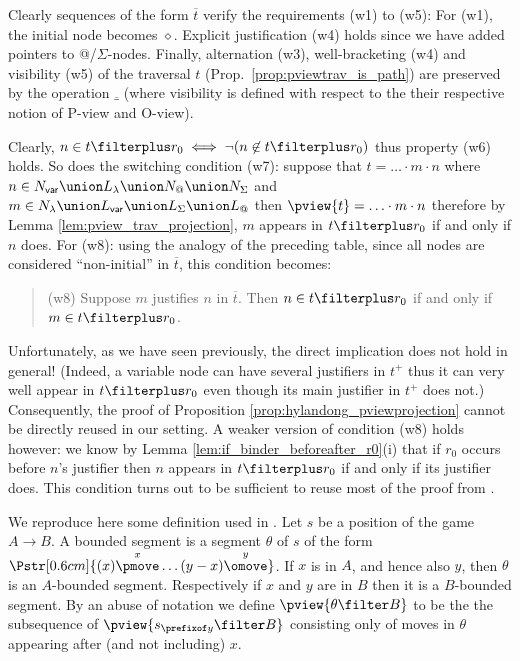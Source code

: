 Clearly sequences of the form $\overline{t}$ verify the requirements (w1) to (w5): For (w1), the initial node
becomes $\diamond$. Explicit justification (w4) holds since we have added pointers to @/$\Sigma$-nodes.
Finally, alternation (w3), well-bracketing (w4) and visibility (w5) of the traversal $t$ (Prop.\
\ref{prop:pviewtrav_is_path}) are preserved by the operation $\overline{\_}$
(where visibility is defined with respect to the their respective
notion of P-view and O-view).

Clearly, $n \in t\filterplus r_0 \iff \neg ( n \not\in t\filterplus
r_0)$ thus property (w6) holds. So does the switching condition
(w7): suppose that $t = \ldots \cdot m \cdot n$ where $n\in N_{\sf
var} \union L_\lambda \union N_@ \union N_\Sigma$ and $m \in
N_\lambda \union L_{\sf var} \union L_\Sigma \union L_@$ then
$\pview{t} = \ldots \cdot m \cdot n$ therefore by Lemma
\ref{lem:pview_trav_projection}, $m$ appears in $t\filterplus r_0$
if and only if $n$ does. For (w8): using the analogy of the
preceding table, since all nodes are considered ``non-initial'' in
$\overline{t}$, this condition becomes:
\begin{quote}
 (w8) Suppose $m$ justifies $n$ in $\overline{t}$. Then $n \in t\filterplus r_0$ if and only if $m\in t\filterplus r_0$.
\end{quote}
Unfortunately, as we have seen previously, the direct implication does not hold in general! (Indeed, a variable node can have several
justifiers in $t^+$ thus it can very well appear in $t\filterplus r_0$ even though its main justifier in $t^+$ does not.) Consequently, the proof of Proposition \ref{prop:hylandong_pviewprojection} cannot be
directly reused in our setting. A weaker version of condition (w8) holds however: we know by Lemma \ref{lem:if_binder_beforeafter_r0}(i) that if $r_0$ occurs before $n$'s justifier then $n$ appears in
$t\filterplus r_0$ if and only if its justifier does.
This condition turns out to be sufficient to reuse most of the proof from \cite{hylandong_pcf}.

We reproduce here some definition used in \cite{hylandong_pcf}. Let
$s$ be a position of the game $A\rightarrow B$. A bounded segment is
a segment $\theta$ of $s$ of the form
$\Pstr[0.6cm]{(x){\stackrel{x}\pmove} \ldots
(y-x){\stackrel{y}\omove}}$. If $x$ is in $A$, and hence also $y$,
then $\theta$ is an $A$-bounded segment. Respectively if $x$ and $y$
are in $B$ then it is a $B$-bounded segment. By an abuse of notation
we define $\pview{\theta \filter B}$ to be the the subsequence of
$\pview{s_{\prefixof y} \filter B}$ consisting only of moves in
$\theta$ appearing after (and not including) $x$.

